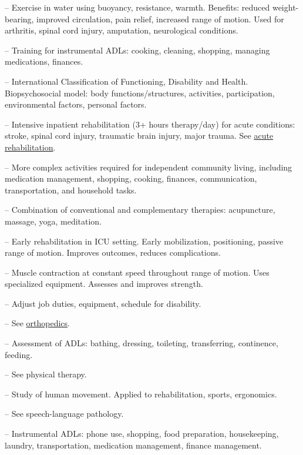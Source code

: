 -- Exercise in water using buoyancy, resistance, warmth. Benefits: reduced weight-bearing, improved circulation, pain relief, increased range of motion. Used for arthritis, spinal cord injury, amputation, neurological conditions.

-- Training for instrumental ADLs: cooking, cleaning, shopping, managing medications, finances.

-- International Classification of Functioning, Disability and Health. Biopsychosocial model: body functions/structures, activities, participation, environmental factors, personal factors.

-- Intensive inpatient rehabilitation (3+ hours therapy/day) for acute conditions: stroke, spinal cord injury, traumatic brain injury, major trauma. See \hyperlink{Acute Rehabilitation}{acute rehabilitation}.

-- More complex activities required for independent community living, including medication management, shopping, cooking, finances, communication, transportation, and household tasks.

-- Combination of conventional and complementary therapies: acupuncture, massage, yoga, meditation.

-- Early rehabilitation in ICU setting. Early mobilization, positioning, passive range of motion. Improves outcomes, reduces complications.

-- Muscle contraction at constant speed throughout range of motion. Uses specialized equipment. Assesses and improves strength.

-- Adjust job duties, equipment, schedule for disability.

-- See \hyperlink{orthopedics}{orthopedics}.

-- Assessment of ADLs: bathing, dressing, toileting, transferring, continence, feeding.

-- See physical therapy.

-- Study of human movement. Applied to rehabilitation, sports, ergonomics.

-- See speech-language pathology.

-- Instrumental ADLs: phone use, shopping, food preparation, housekeeping, laundry, transportation, medication management, finance management.

